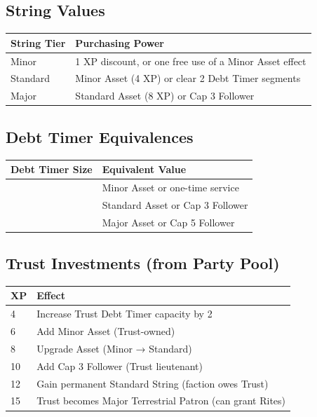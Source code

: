 \subsection{String Values}
\label{ref:string-values}

\begin{center}
\small
\begin{tabular}{ll}
\toprule
\textbf{String Tier} & \textbf{Purchasing Power} \\
\midrule
Minor & 1 XP discount, or one free use of a Minor Asset effect \\
Standard & Minor Asset (4 XP) or clear 2 Debt Timer segments \\
Major & Standard Asset (8 XP) or Cap 3 Follower \\
\bottomrule
\end{tabular}
\end{center}

\subsection{Debt Timer Equivalences}
\label{ref:debt-timer}

\begin{center}
\small
\begin{tabular}{ll}
\toprule
\textbf{Debt Timer Size} & \textbf{Equivalent Value} \\
\midrule
[4] & Minor Asset or one-time service \\
[6] & Standard Asset or Cap 3 Follower \\
[8] & Major Asset or Cap 5 Follower \\
\bottomrule
\end{tabular}
\end{center}

\subsection{Trust Investments (from Party Pool)}
\label{ref:trust-invest}

\begin{center}
\small
\begin{tabular}{ll}
\toprule
\textbf{XP} & \textbf{Effect} \\
\midrule
4 & Increase Trust Debt Timer capacity by 2 \\
6 & Add Minor Asset (Trust-owned) \\
8 & Upgrade Asset (Minor → Standard) \\
10 & Add Cap 3 Follower (Trust lieutenant) \\
12 & Gain permanent Standard String (faction owes Trust) \\
15 & Trust becomes Major Terrestrial Patron (can grant Rites) \\
\bottomrule
\end{tabular}
\end{center}

